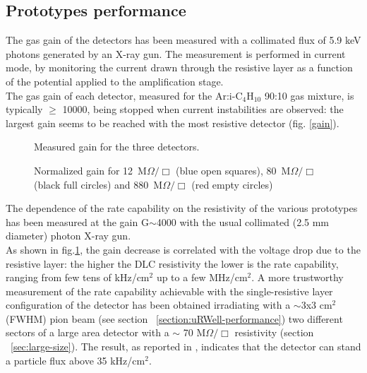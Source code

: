 \subsection{Prototypes performance}
\label{sec:performance-single}
%
The gas gain of the detectors has been measured with a collimated flux of 5.9 keV photons generated by an X-ray gun.
The measurement is performed in current mode, by monitoring the current drawn through the resistive layer as a function of the potential applied to the amplification stage.\\
The gas gain of each detector, measured for the Ar:i-C$_{4}$H$_{10}$ 90:10 gas mixture, 
is typically $\geq$ 10000, being stopped when current instabilities are observed: the largest gain seems to be reached with the most resistive detector (fig. \ref{gain}).
%
\begin{figure}
\centering
\begin{minipage}{0.47\textwidth}
\centering
		\vspace{-0.9cm}
        \caption{Measured gain for the three detectors.}
        \label{gain}
        \end{minipage}
        \hspace{0.5cm}
 	\begin{minipage}{0.47\textwidth}
    \centering
        \caption{Normalized gain for 12~M$\Omega/\Box$ (blue open squares), 80~M$\Omega/\Box$ (black full circles) and 880~M$\Omega/\Box$ (red empty circles)}
    	\label{ratecapa-single}
	\end{minipage}
\end{figure}
%
The dependence of the rate capability on the resistivity of the various prototypes has been measured at the gain G$\sim$4000 with the usual collimated (2.5 mm diameter) photon X-ray gun.\\
As shown in fig.\ref{ratecapa-single}, the gain decrease is correlated with the voltage drop due to the resistive layer: the higher the DLC resistivity the lower is the rate capability, ranging from few tens of kHz/cm$^2$ up to a few MHz/cm$^2$. 
A more trustworthy measurement of the rate capability achievable with the single-resistive layer configuration of the detector has been obtained irradiating with a $\sim$3x3 cm$^2$ (FWHM) pion beam (see section ~\ref{section:uRWell-performance}) two different sectors of a large area detector with a $\sim$ 70 M$\Omega/\Box$ resistivity (section ~\ref{sec:large-size}). The result, as reported in \cite{NIM-RWELL-1}, indicates that the detector can stand a particle flux above 35 kHz/cm$^2$.\\
